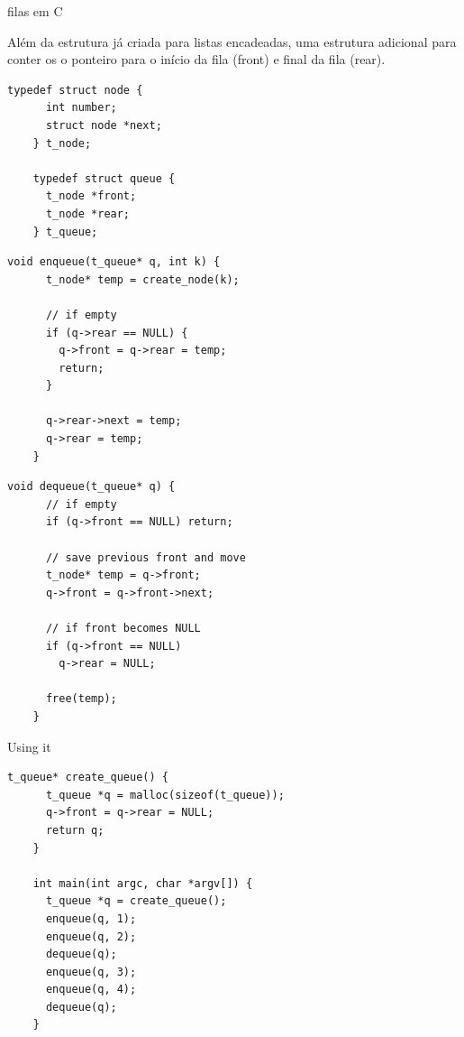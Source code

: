\documentclass{beamer}
\begin{document}
\begin{frame}{filas em C}
  
  Além da estrutura já criada para listas encadeadas, uma estrutura
  adicional para conter os o ponteiro para o início da fila (front) e
  final da fila (rear).

  \begin{lstlisting}[style=normalc,caption=src/queue-list.c]
    typedef struct node {
      int number;
      struct node *next;
    } t_node;
    
    typedef struct queue {
      t_node *front;
      t_node *rear;
    } t_queue;
  \end{lstlisting}

  \framebreak

  \begin{lstlisting}[style=normalc,caption=src/queue-list.c]
    void enqueue(t_queue* q, int k) {
      t_node* temp = create_node(k);

      // if empty
      if (q->rear == NULL) {
        q->front = q->rear = temp;
        return;
      }
      
      q->rear->next = temp;
      q->rear = temp;
    }
  \end{lstlisting}

  \framebreak

  \begin{lstlisting}[style=normalc,caption=src/queue-list.c]
    void dequeue(t_queue* q) {
      // if empty
      if (q->front == NULL) return;

      // save previous front and move
      t_node* temp = q->front;
      q->front = q->front->next;

      // if front becomes NULL
      if (q->front == NULL)
        q->rear = NULL;
      
      free(temp);
    }
  \end{lstlisting}

  \framebreak

  Using it

  \begin{lstlisting}[style=normalc]
    t_queue* create_queue() {
      t_queue *q = malloc(sizeof(t_queue));
      q->front = q->rear = NULL;
      return q;
    }
    
    int main(int argc, char *argv[]) {
      t_queue *q = create_queue();
      enqueue(q, 1);
      enqueue(q, 2);
      dequeue(q);
      enqueue(q, 3);
      enqueue(q, 4);
      dequeue(q);
    }
  \end{lstlisting}
  
\end{frame}
\end{document}
